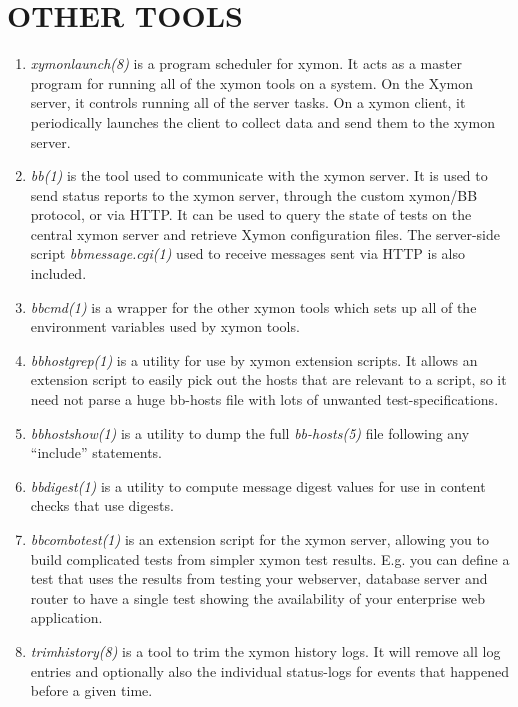 \section{OTHER TOOLS}

\begin{enumerate}

\item \emph{xymonlaunch(8)}
 is a program scheduler for xymon. It acts as a master program for
 running all of the xymon tools on a system. On the Xymon server, it
 controls running all of the server tasks. On a xymon client, it
 periodically launches the client to collect data and send them to the
 xymon server. 


\item  \emph{bb(1)}
 is the tool used to communicate with the xymon server. It is used to
 send status reports to the xymon server, through the custom
 xymon/BB protocol, or via HTTP. It can be used to query the state of
 tests on the central xymon server and retrieve Xymon configuration
 files. The server-side script \emph{bbmessage.cgi(1) } used to
 receive messages sent via HTTP is also included. 


\item  \emph{bbcmd(1)}
 is a wrapper for the other xymon tools which sets up all of the
 environment variables used by xymon tools. 



\item  \emph{bbhostgrep(1)}
 is a utility for use by xymon extension scripts. It allows an
 extension script to easily pick out the hosts that are relevant to a
 script, so it need not parse a huge bb-hosts file with lots of
 unwanted test-specifications. 



\item  \emph{bbhostshow(1)}
 is a utility to dump the full \emph{bb-hosts(5)}
 file following any ``include'' statements. 


\item  \emph{bbdigest(1)}
 is a utility to compute message digest values for use in content checks that use digests. 


\item  \emph{bbcombotest(1)}
 is an extension script for the xymon server, allowing you to build
 complicated tests from simpler xymon test results. E.g. you can
 define a test that uses the results from testing your webserver,
 database server and router to have a single test showing the
 availability of your enterprise web application. 



\item  \emph{trimhistory(8)}
 is a tool to trim the xymon history logs. It will remove all log
 entries and optionally also the individual status-logs for events
 that happened before a given time. 

\end{enumerate}

